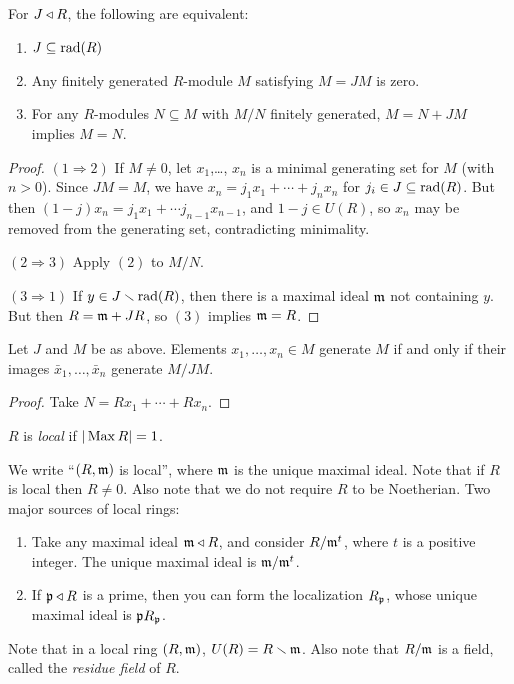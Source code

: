  \begin{lemma}
   For $J\triangleleft R$, the following are equivalent:
   \begin{enumerate}
     \item $J\subseteq \operatorname{rad}(R)$
     \item Any finitely generated $R$-module $M$ satisfying $M=JM$ is zero.
     \item For any $R$-modules $N\subseteq M$ with $M/N$ finitely generated, $M=N+JM$
     implies $M=N$.
   \end{enumerate}
 \end{lemma}
 \begin{proof}
   $(1\Rightarrow 2)$ If $M\neq 0$, let $x_1$,\dots, $x_n$ is a minimal generating set
   for $M$ (with $n>0$). Since $JM = M$, we have $x_n= j_1 x_1+ \cdots + j_n
   x_n$ for $j_i\in J\subseteq \operatorname{rad}(R)$. But then $(1-j)x_n = j_1x_1+\cdots
   j_{n-1}x_{n-1}$, and $1-j\in U(R)$, so $x_n$ may be removed from the generating set,
   contradicting minimality.

   $(2\Rightarrow 3)$ Apply $(2)$ to $M/N$.

   $(3\Rightarrow 1)$ If $y\in J\smallsetminus \operatorname{rad}(R)$, then there is a maximal ideal
   $\mathfrak{m}$ not containing $y$. But then $R = \mathfrak{m} + JR$, so $(3)$ implies $\mathfrak{m}=R$.
 \end{proof}

 \begin{corollary}[2.10]
   Let $J$ and $M$ be as above. Elements $x_1,\dots,x_n\in M$ generate $M$ if and only if
   their images $\bar x_1,\dots, \bar x_n$ generate $M/JM$.
 \end{corollary}
 \begin{proof}
   Take $N=Rx_1+\cdots + Rx_n$.
 \end{proof}

 \begin{definition}
   $R$ is \emph{local} if $|\operatorname{Max} R|=1$.
 \end{definition}
 We write ``$(R,\mathfrak{m})$ is local'', where $\mathfrak{m}$ is the unique maximal ideal. Note that if
 $R$ is local then $R\neq 0$. Also note that we do not require $R$ to be Noetherian.
 \noindent Two major sources of local rings:
 \begin{enumerate}
   \item Take any maximal ideal $\mathfrak{m}\triangleleft R$, and consider $R/\mathfrak{m}^t$, where $t$ is a positive
   integer. The unique maximal ideal is $\mathfrak{m}/\mathfrak{m}^t$.

   \item If $\mathfrak{p}\triangleleft R$ is a prime, then you can form the localization $R_{\mathfrak{p}}$, whose unique
   maximal ideal is $\mathfrak{p} R_{\mathfrak{p}}$.
 \end{enumerate}
 Note that in a local ring $(R,\mathfrak{m})$, $U(R)=R\smallsetminus \mathfrak{m}$. Also note that $R/\mathfrak{m}$ is
 a field, called the \emph{residue field} of $R$.

